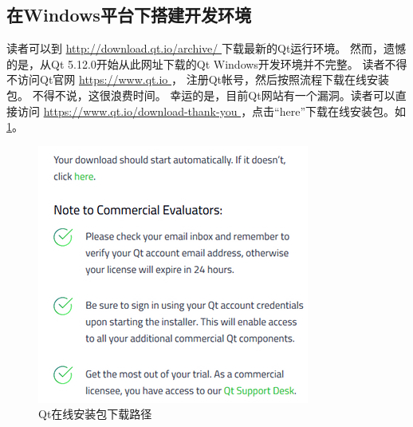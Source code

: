 ﻿%




%


\subsection{
在Windows平台下搭建开发环境
}\label{s000110}


读者可以到 \url{http://download.qt.io/archive/
}
下载最新的Qt运行环境。
然而，遗憾的是，从Qt 5.12.0开始从此网址下载的Qt Windows开发环境并不完整。
读者不得不访问Qt官网 \url{https://www.qt.io
}，
注册Qt帐号，然后按照流程下载在线安装包。
不得不说，这很浪费时间。
幸运的是，目前Qt网站有一个漏洞。读者可以直接访问
 \url{https://www.qt.io/download-thank-you
}，点击“here”下载在线安装包。如\figurename\;\ref{p000000}。

\begin{figure}[ht] %
\centering %
\includegraphics{chapter01/windows_download_here.png} %
\caption{Qt在线安装包下载路径} %
\label{p000000} %
\end{figure}















